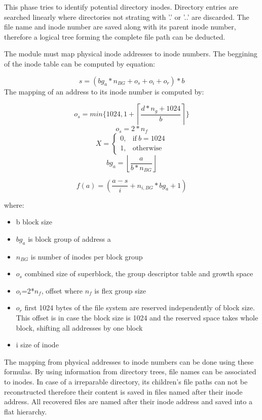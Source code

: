 \documentclass{acm_proc_article-sp}
\begin{document}
\begin{enumerate}
This phase tries to identify potential directory inodes. Directory entries are searched linearly where directories not strating with '.' or '..' are discarded. The file name and inode number are saved along with its parent inode number, therefore a logical tree forming the complete file path can be deducted.

The module must map physical inode addresses to inode numbers. The beggining of the inode table can be computed by equation:

\[s=(bg_a * n_{BG} +o_s + o_i +o_r)*b  \]
The mapping of an address to its inode number is computed by:

\[o_s=min \{1024, 1+ \left\lceil \frac{d*n_g+1024}{b} \right\rceil \} \]
\[ o_s=2*n_f\]
\begin{equation}
  X=
  \begin{cases}
    0, & \text{if}\ b=1024 \\
    1, & \text{otherwise}
  \end{cases}
\end{equation}
\[bg_a=\left\lfloor \frac{a}{b*n_{BG}} \right\rfloor \]

\[f(a)=(\frac{a-s}{i} +n_{i,BG} *bg_a +1) \]

where:
\begin{itemize}
\item b block size

\item $bg_a$ is block group of address a

\item $n_{BG}$ is number of inodes per block group

\item $o_s$ combined size of superblock, the group descriptor table and growth space

\item $o_i$=2*$n_f$, offset where $n_f$ is flex group size

\item $o_r$ first 1024 bytes of the file system are reserved independently of block size. This offset is in case the block size is 1024 and the reserved space takes whole block, shifting all addresses by one block 

\item i size of inode 
\end{itemize}

The mapping from physical addresses to inode numbers can be done using these formulas. By using information from directory trees, file names can be associated to inodes. In case of a irreparable directory, its children's file paths can not be reconstructed therefore their content is saved in files named after their inode address. All recovered files are named after their inode address and saved into a flat hierarchy.




\end{enumerate}
\end{document}
